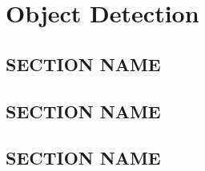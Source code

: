\chapter{Object Detection}


\section{SECTION NAME}

\section{SECTION NAME}

\section{SECTION NAME}
